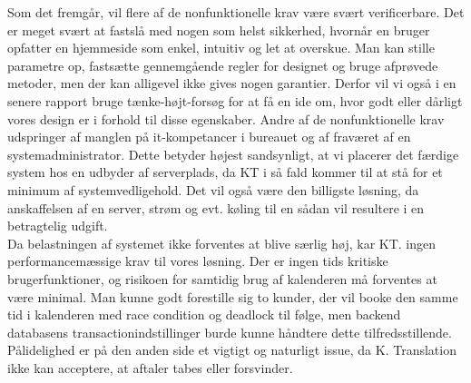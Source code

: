 \documentclass[12pt]{article}   %
\begin{document}
Som det fremgår, vil flere af de nonfunktionelle krav være svært verificerbare. 
Det er meget svært at fastslå med nogen som helst sikkerhed, hvornår en bruger
opfatter en hjemmeside som enkel, intuitiv og let at overskue. Man kan stille
parametre op, fastsætte gennemgående regler for designet og bruge afprøvede
metoder, men der kan alligevel ikke gives nogen garantier. Derfor vil vi også
i en senere rapport bruge tænke-højt-forsøg for at få en ide om, hvor godt
eller dårligt vores design er i forhold til disse egenskaber. Andre af de
nonfunktionelle krav udspringer af manglen på it-kompetancer i bureauet og af
fraværet af en systemadministrator. Dette betyder højest sandsynligt, at vi 
placerer det færdige system hos en udbyder af serverplads, da KT i så fald kommer 
til at stå for et minimum af systemvedligehold. Det vil også være den billigste
løsning, da anskaffelsen af en server, strøm og evt. køling til en sådan vil
resultere i en betragtelig udgift. \\
Da belastningen af systemet ikke forventes at blive særlig høj, kar KT. ingen 
performancemæssige krav til vores løsning. Der er ingen tids kritiske
brugerfunktioner, og risikoen for samtidig brug af kalenderen må forventes at
være minimal. Man kunne godt forestille sig to kunder, der vil booke den samme 
tid i kalenderen med race condition og deadlock til følge, men backend
databasens transactionindstillinger burde kunne håndtere dette
tilfredsstillende. Pålidelighed er på den anden side et vigtigt og naturligt
issue, da K. Translation ikke kan acceptere, at aftaler tabes eller
forsvinder. \\ 
\end{document}
